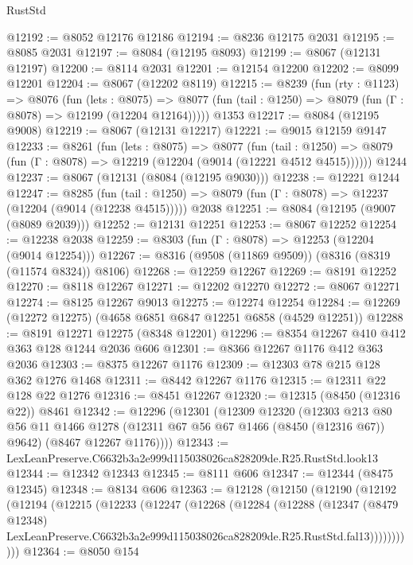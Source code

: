 \begin{lexlean}{RustStd}
\begin{coremodule}
@12192 := @8052 @12176 @12186
@12194 := @8236 @12175 @2031
@12195 := @8085 @2031
@12197 := @8084 (@12195 @8093)
@12199 := @8067 (@12131 @12197)
@12200 := @8114 @2031
@12201 := @12154 @12200
@12202 := @8099 @12201
@12204 := @8067 (@12202 @8119)
@12215 := @8239
    (fun (rty : @1123) =>
    @8076
      (fun (lets : @8075) =>
      @8077 (fun (tail : @1250) => @8079 (fun (Γ : @8078) => @12199 (@12204 @12164)))))
    @1353
@12217 := @8084 (@12195 @9008)
@12219 := @8067 (@12131 @12217)
@12221 := @9015 @12159 @9147
@12233 := @8261
    (fun (lets : @8075) =>
    @8077
      (fun (tail : @1250) =>
      @8079 (fun (Γ : @8078) => @12219 (@12204 (@9014 (@12221 @4512 @4515))))))
    @1244
@12237 := @8067 (@12131 (@8084 (@12195 @9030)))
@12238 := @12221 @1244
@12247 := @8285
    (fun (tail : @1250) => @8079 (fun (Γ : @8078) => @12237 (@12204 (@9014 (@12238 @4515)))))
    @2038
@12251 := @8084 (@12195 (@9007 (@8089 @2039)))
@12252 := @12131 @12251
@12253 := @8067 @12252
@12254 := @12238 @2038
@12259 := @8303 (fun (Γ : @8078) => @12253 (@12204 (@9014 @12254)))
@12267 := @8316 (@9508 (@11869 @9509)) (@8316 (@8319 (@11574 @8324)) @8106)
@12268 := @12259 @12267
@12269 := @8191 @12252
@12270 := @8118 @12267
@12271 := @12202 @12270
@12272 := @8067 @12271
@12274 := @8125 @12267 @9013
@12275 := @12274 @12254
@12284 := @12269 (@12272 @12275) (@4658 @6851 @6847 @12251 @6858 (@4529 @12251))
@12288 := @8191 @12271 @12275 (@8348 @12201)
@12296 := @8354 @12267 @410 @412 @363 @128 @1244 @2036 @606
@12301 := @8366 @12267 @1176 @412 @363 @2036
@12303 := @8375 @12267 @1176
@12309 := @12303 @78 @215 @128 @362 @1276 @1468
@12311 := @8442 @12267 @1176
@12315 := @12311 @22 @128 @22 @1276
@12316 := @8451 @12267
@12320 := @12315 (@8450 (@12316 @22)) @8461
@12342 := @12296
    (@12301
      (@12309
        @12320
        (@12303
          @213
          @80
          @56
          @11
          @1466
          @1278
          (@12311 @67 @56 @67 @1466 (@8450 (@12316 @67)) @9642)
          (@8467 @12267 @1176))))
@12343 := LexLeanPreserve.C6632b3a2e999d115038026ca828209de.R25.RustStd.look13
@12344 := @12342 @12343
@12345 := @8111 @606
@12347 := @12344 (@8475 @12345)
@12348 := @8134 @606
@12363 := @12128
    (@12150
      (@12190
        (@12192
          (@12194
            (@12215
              (@12233
                (@12247
                  (@12268
                    (@12284
                      (@12288
                        (@12347
                          (@8479 @12348)
                          LexLeanPreserve.C6632b3a2e999d115038026ca828209de.R25.RustStd.fal13)))))))))))
@12364 := @8050 @154

\end{coremodule}
\end{lexlean}
